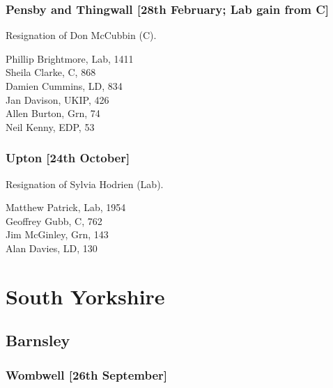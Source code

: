 \documentclass[a4paper,openany,10pt]{book}
\begin{document}
\subsubsection*{Pensby and Thingwall \hspace*{\fill}\nolinebreak[1]%
\enspace\hspace*{\fill}
[28th February; Lab gain from C]}


Resignation of Don McCubbin (C).



Phillip Brightmore, Lab, 1411\\
Sheila Clarke, C, 868\\
Damien Cummins, LD, 834\\
Jan Davison, UKIP, 426\\
Allen Burton, Grn, 74\\
Neil Kenny, EDP, 53\\


\subsubsection*{Upton \hspace*{\fill}\nolinebreak[1]%
\enspace\hspace*{\fill}
[24th October]}


Resignation of Sylvia Hodrien (Lab).



Matthew Patrick, Lab, 1954\\
Geoffrey Gubb, C, 762\\
Jim McGinley, Grn, 143\\
Alan Davies, LD, 130\\


\vfill

\section[South Yorkshire]{{South Yorkshire}}

\subsection*{Barnsley}

\subsubsection*{Wombwell \hspace*{\fill}\nolinebreak[1]%
\enspace\hspace*{\fill}
[26th September]}
\end{document}

